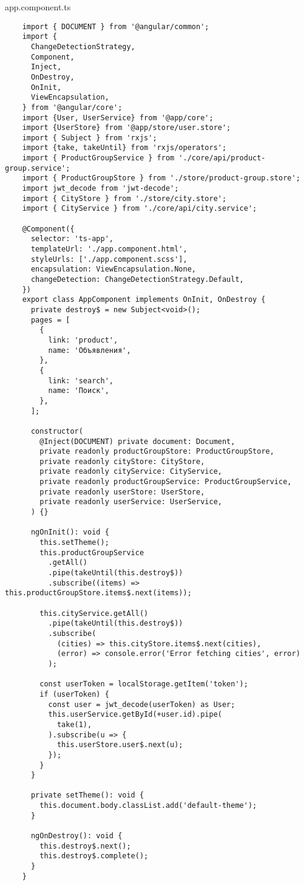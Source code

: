 app.component.ts
\begin{lstlisting}
    import { DOCUMENT } from '@angular/common';
    import {
      ChangeDetectionStrategy,
      Component,
      Inject,
      OnDestroy,
      OnInit,
      ViewEncapsulation,
    } from '@angular/core';
    import {User, UserService} from '@app/core';
    import {UserStore} from '@app/store/user.store';
    import { Subject } from 'rxjs';
    import {take, takeUntil} from 'rxjs/operators';
    import { ProductGroupService } from './core/api/product-group.service';
    import { ProductGroupStore } from './store/product-group.store';
    import jwt_decode from 'jwt-decode';
    import { CityStore } from './store/city.store';
    import { CityService } from './core/api/city.service';
    
    @Component({
      selector: 'ts-app',
      templateUrl: './app.component.html',
      styleUrls: ['./app.component.scss'],
      encapsulation: ViewEncapsulation.None,
      changeDetection: ChangeDetectionStrategy.Default,
    })
    export class AppComponent implements OnInit, OnDestroy {
      private destroy$ = new Subject<void>();
      pages = [
        {
          link: 'product',
          name: 'Объявления',
        },
        {
          link: 'search',
          name: 'Поиск',
        },
      ];
    
      constructor(
        @Inject(DOCUMENT) private document: Document,
        private readonly productGroupStore: ProductGroupStore,
        private readonly cityStore: CityStore,
        private readonly cityService: CityService,
        private readonly productGroupService: ProductGroupService,
        private readonly userStore: UserStore,
        private readonly userService: UserService,
      ) {}
    
      ngOnInit(): void {
        this.setTheme();
        this.productGroupService
          .getAll()
          .pipe(takeUntil(this.destroy$))
          .subscribe((items) => this.productGroupStore.items$.next(items));
    
        this.cityService.getAll()
          .pipe(takeUntil(this.destroy$))
          .subscribe(
            (cities) => this.cityStore.items$.next(cities),
            (error) => console.error('Error fetching cities', error)
          );
    
        const userToken = localStorage.getItem('token');
        if (userToken) {
          const user = jwt_decode(userToken) as User;
          this.userService.getById(+user.id).pipe(
            take(1),
          ).subscribe(u => {
            this.userStore.user$.next(u);
          });
        }
      }
    
      private setTheme(): void {
        this.document.body.classList.add('default-theme');
      }
    
      ngOnDestroy(): void {
        this.destroy$.next();
        this.destroy$.complete();
      }
    }    
\end{lstlisting}

